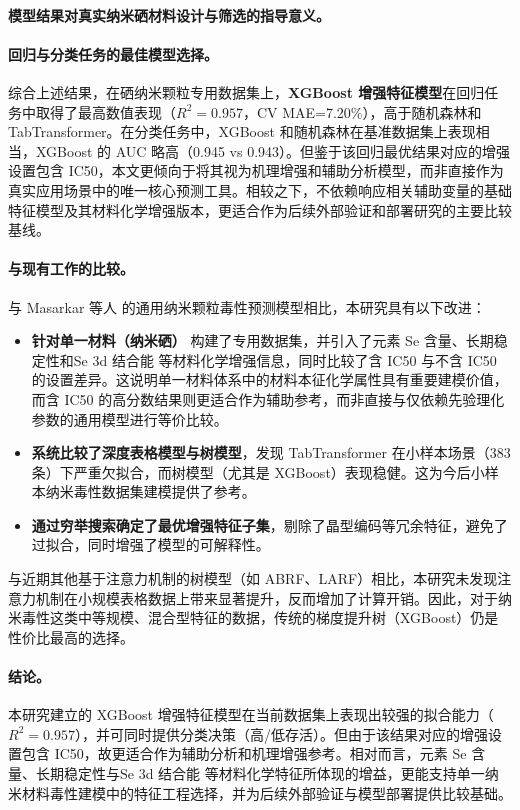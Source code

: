 \documentclass[letterpaper]{article}
\begin{document}
\paragraph{模型结果对真实纳米硒材料设计与筛选的指导意义。}

\paragraph{回归与分类任务的最佳模型选择。}
综合上述结果，在硒纳米颗粒专用数据集上，\textbf{XGBoost 增强特征模型}在回归任务中取得了最高数值表现（$R^2=0.957$，CV MAE=7.20\%），高于随机森林和 TabTransformer。在分类任务中，XGBoost 和随机森林在基准数据集上表现相当，XGBoost 的 AUC 略高（0.945 vs 0.943）。但鉴于该回归最优结果对应的增强设置包含 IC50，本文更倾向于将其视为机理增强和辅助分析模型，而非直接作为真实应用场景中的唯一核心预测工具。相较之下，不依赖响应相关辅助变量的基础特征模型及其材料化学增强版本，更适合作为后续外部验证和部署研究的主要比较基线。

\paragraph{与现有工作的比较。}
与 Masarkar 等人 \cite{masarkar2024} 的通用纳米颗粒毒性预测模型相比，本研究具有以下改进：
\begin{itemize}
  \item \textbf{针对单一材料（纳米硒）} 构建了专用数据集，并引入了元素 Se 含量、长期稳定性和Se 3d 结合能 等材料化学增强信息，同时比较了含 IC50 与不含 IC50 的设置差异。这说明单一材料体系中的材料本征化学属性具有重要建模价值，而含 IC50 的高分数结果则更适合作为辅助参考，而非直接与仅依赖先验理化参数的通用模型进行等价比较。
  \item \textbf{系统比较了深度表格模型与树模型}，发现 TabTransformer 在小样本场景（383 条）下严重欠拟合，而树模型（尤其是 XGBoost）表现稳健。这为今后小样本纳米毒性数据集建模提供了参考。
  \item \textbf{通过穷举搜索确定了最优增强特征子集}，剔除了晶型编码等冗余特征，避免了过拟合，同时增强了模型的可解释性。
\end{itemize}
与近期其他基于注意力机制的树模型（如 ABRF、LARF）相比，本研究未发现注意力机制在小规模表格数据上带来显著提升，反而增加了计算开销。因此，对于纳米毒性这类中等规模、混合型特征的数据，传统的梯度提升树（XGBoost）仍是性价比最高的选择。

\paragraph{结论。}
本研究建立的 XGBoost 增强特征模型在当前数据集上表现出较强的拟合能力（$R^2=0.957$），并可同时提供分类决策（高/低存活）。但由于该结果对应的增强设置包含 IC50，故更适合作为辅助分析和机理增强参考。相对而言，元素 Se 含量、长期稳定性与Se 3d 结合能 等材料化学特征所体现的增益，更能支持单一纳米材料毒性建模中的特征工程选择，并为后续外部验证与模型部署提供比较基础。
\end{document}
